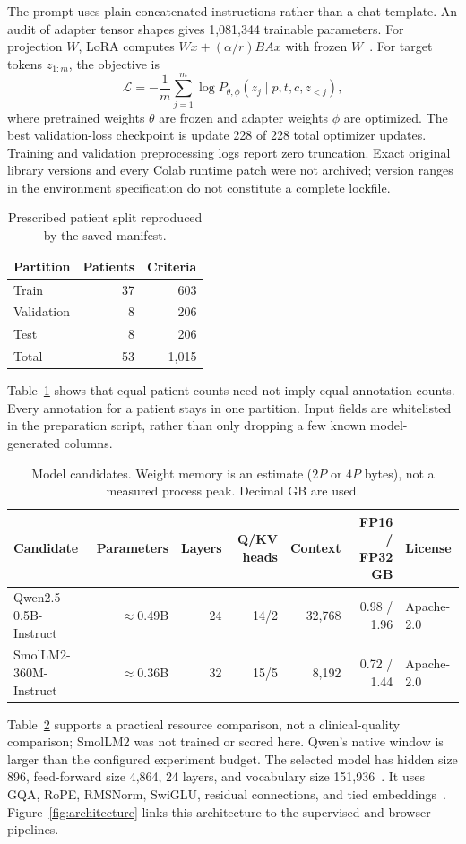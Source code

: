 \documentclass[conference]{IEEEtran}
\begin{document}
The prompt uses plain concatenated instructions rather than a chat template. An audit of adapter tensor shapes gives 1,081,344 trainable parameters. For projection $W$, LoRA computes $Wx+(\alpha/r)BAx$ with frozen $W$~\cite{hu2021lora}. For target tokens $z_{1:m}$, the objective is
\begin{equation}
\mathcal{L}=-\frac{1}{m}\sum_{j=1}^{m}\log P_{\theta,\phi}(z_j\mid p,t,c,z_{<j}),
\end{equation}
where pretrained weights $\theta$ are frozen and adapter weights $\phi$ are optimized. The best validation-loss checkpoint is update 228 of 228 total optimizer updates. Training and validation preprocessing logs report zero truncation. Exact original library versions and every Colab runtime patch were not archived; version ranges in the environment specification do not constitute a complete lockfile.

\begin{table}[t]\centering
\caption{Prescribed patient split reproduced by the saved manifest.}
\label{tab:split}
\begin{tabular}{lrr}\toprule Partition & Patients & Criteria\\\midrule
Train & 37 & 603\\Validation & 8 & 206\\Test & 8 & 206\\\midrule Total & 53 & 1,015\\\bottomrule
\end{tabular}\end{table}
Table~\ref{tab:split} shows that equal patient counts need not imply equal annotation counts. Every annotation for a patient stays in one partition. Input fields are whitelisted in the preparation script, rather than only dropping a few known model-generated columns.

\begin{table}[t]\centering
\caption{Model candidates. Weight memory is an estimate ($2P$ or $4P$ bytes), not a measured process peak. Decimal GB are used.}
\label{tab:models}
\begin{tabular}{lrrrrrl}\toprule Candidate & Parameters & Layers & Q/KV heads & Context & FP16 / FP32 GB & License\\\midrule
Qwen2.5-0.5B-Instruct~\cite{qwenmodel,qwenconfig} & $\approx$0.49B & 24 & 14/2 & 32,768 & 0.98 / 1.96 & Apache-2.0\\
SmolLM2-360M-Instruct~\cite{smolmodel,smolconfig} & $\approx$0.36B & 32 & 15/5 & 8,192 & 0.72 / 1.44 & Apache-2.0\\\bottomrule
\end{tabular}\end{table}
Table~\ref{tab:models} supports a practical resource comparison, not a clinical-quality comparison; SmolLM2 was not trained or scored here. Qwen's native window is larger than the configured experiment budget. The selected model has hidden size 896, feed-forward size 4,864, 24 layers, and vocabulary size 151,936~\cite{qwenconfig}. It uses GQA, RoPE, RMSNorm, SwiGLU, residual connections, and tied embeddings~\cite{qwenmodel}. Figure~\ref{fig:architecture} links this architecture to the supervised and browser pipelines.
\end{document}
